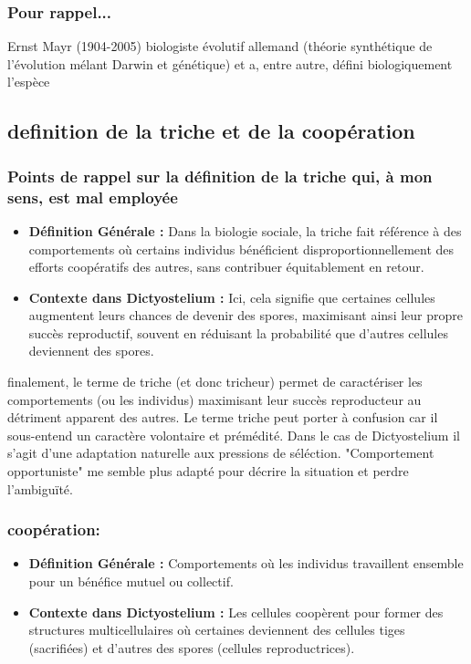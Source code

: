\documentclass[twocolumn,10pt]{article} %
\begin{document}
               \subsubsection{Pour rappel...}
               Ernst Mayr (1904-2005) biologiste évolutif allemand (théorie synthétique de l'évolution mélant Darwin et génétique) et a, entre autre, défini biologiquement l'espèce
   
    \subsection{definition de la triche et de la coopération}
                \subsubsection{Points de rappel sur la définition de la triche qui, à mon sens, est mal employée}
                    \begin{itemize}
                        \item \textbf{Définition Générale :} Dans la biologie sociale, la triche fait référence à des comportements où certains individus
                        bénéficient disproportionnellement des efforts coopératifs des autres, sans contribuer équitablement en retour.
                        \item \textbf{Contexte dans Dictyostelium :} Ici, cela signifie que certaines cellules augmentent leurs chances de devenir des
                        spores, maximisant ainsi leur propre succès reproductif, souvent en réduisant la probabilité que d'autres
                        cellules deviennent des spores.
                    \end{itemize}

                    finalement, le terme de triche (et donc tricheur) permet de caractériser les comportements (ou les individus) maximisant
                    leur succès reproducteur au détriment apparent des autres. Le terme triche peut porter à confusion car il sous-entend un caractère
                    volontaire et prémédité. Dans le cas de Dictyostelium il s'agit d'une adaptation naturelle aux pressions de séléction. 
                    "Comportement opportuniste" me semble plus adapté pour décrire la situation et perdre l'ambiguïté. 

                \subsubsection{coopération:}
                    \begin{itemize}
                        \item \textbf{Définition Générale :} Comportements où les individus travaillent ensemble pour un bénéfice mutuel ou collectif.
                        \item \textbf{Contexte dans Dictyostelium :} Les cellules coopèrent pour former des structures multicellulaires où certaines 
                        deviennent des cellules tiges (sacrifiées) et d'autres des spores (cellules reproductrices).
                    \end{itemize}
\end{document}

